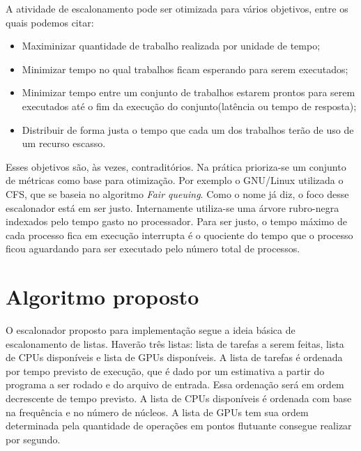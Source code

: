 A atividade de escalonamento pode ser otimizada para vários objetivos, entre os quais podemos citar:
\begin{itemize}
	\item Maximinizar quantidade de trabalho realizada por unidade de tempo;
	\item Minimizar tempo no qual trabalhos ficam esperando para serem executados;
	\item Minimizar tempo entre um conjunto de trabalhos estarem prontos para serem executados até o fim da execução do conjunto(latência ou tempo de resposta);
	\item Distribuir de forma justa o tempo que cada um dos trabalhos terão de uso de um recurso escasso.
\end{itemize}

Esses objetivos são, às vezes, contraditórios. Na prática prioriza-se um conjunto de métricas como base para otimização. Por exemplo o GNU/Linux utilizada o \acrfull{CFS}, que se baseia no algoritmo \textit{Fair queuing}. Como o nome já diz, o foco desse escalonador está em ser justo. Internamente utiliza-se uma árvore rubro-negra indexados pelo tempo gasto no processador. Para ser justo, o tempo máximo de cada processo fica em execução interrupta é o quociente do tempo que o processo ficou aguardando para ser executado pelo número total de processos.

\section{Algoritmo proposto}

O escalonador proposto para implementação segue a ideia básica de escalonamento de listas. Haverão três listas: lista de tarefas a serem feitas, lista de \acrshort{CPU}s disponíveis e lista de \acrshort{GPU}s disponíveis.
A lista de tarefas é ordenada por tempo previsto de execução, que é dado por um estimativa a partir do programa a ser rodado e do arquivo de entrada. Essa ordenação será em ordem decrescente de tempo previsto. A lista de \acrshort{CPU}s disponíveis é ordenada com base na frequência e no número de núcleos. A lista de \acrshort{GPU}s tem sua ordem determinada pela quantidade de operações em pontos flutuante consegue realizar por segundo.

